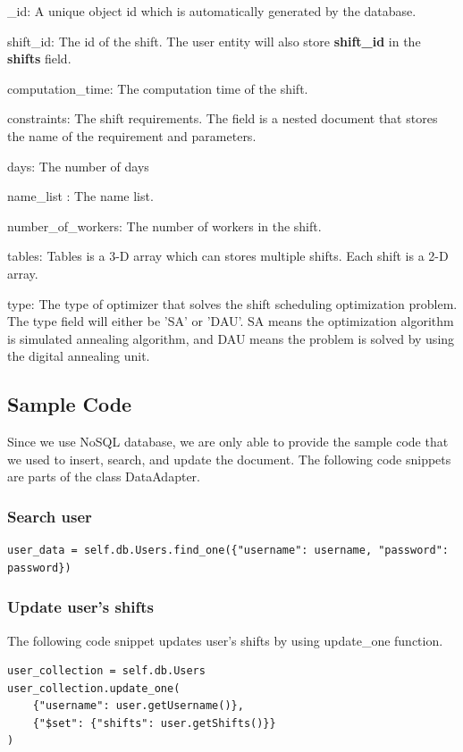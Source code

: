 \documentclass[11pt, oneside]{article}   	%
\begin{document}
\begin{compactenum}[1.]
\item \_id: A unique object id which is automatically generated by the database.
\item shift\_id: The id of the shift. The user entity will also store \textbf{shift\_id} in the \textbf{shifts} field.
\item computation\_time: The computation time of the shift.
\item constraints: The shift requirements. The field is a nested document that stores the name of the requirement and parameters.
\item days: The number of days
\item name\_list : The name list.
\item number\_of\_workers: The number of workers in the shift.
\item tables: Tables is a 3-D array which can stores multiple shifts. Each shift is a 2-D array.
\item type: The type of optimizer that solves the shift scheduling optimization problem. The type field will either be 'SA' or 'DAU'. SA means the optimization algorithm is simulated annealing algorithm, and DAU means the problem is solved by using the digital annealing unit.
\end{compactenum}

\subsection{Sample Code}

Since we use NoSQL database, we are only able to provide the sample code that we used to insert, search, and update the document.
The following code snippets are parts of the class DataAdapter.

\subsubsection{Search user}
\begin{verbatim}
user_data = self.db.Users.find_one({"username": username, "password": password})
\end{verbatim}

\subsubsection{Update user's shifts}
The following code snippet updates user's shifts by using update\_one function.
\begin{verbatim}
user_collection = self.db.Users
user_collection.update_one(
	{"username": user.getUsername()}, 
	{"$set": {"shifts": user.getShifts()}}
)
\end{verbatim}
\end{document}
